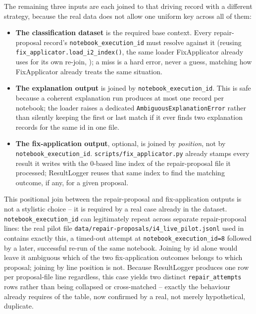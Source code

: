 The remaining three inputs are each joined to that driving record with a
different strategy, because the real data does not allow one uniform key
across all of them:

\begin{itemize}
  \item \textbf{The classification dataset} is the required base context.
        Every repair-proposal record's \texttt{notebook\_execution\_id}
        must resolve against it (reusing
        \texttt{fix\_applicator.load\_i2\_index()}, the same loader
        FixApplicator already uses for its own re-join,
        ); a miss is a hard error, never a guess,
        matching how FixApplicator already treats the same situation.
  \item \textbf{The explanation output} is joined by
        \texttt{notebook\_execution\_id}. This is safe because a coherent
        explanation run produces at most one record per notebook; the
        loader raises a dedicated \texttt{AmbiguousExplanationError} rather
        than silently keeping the first or last match if it ever finds two
        explanation records for the same id in one file.
  \item \textbf{The fix-application output}, optional, is joined by
        \emph{position}, not by \texttt{notebook\_\allowbreak execution\_id}.
        \texttt{scripts/fix\_applicator.py} already stamps every result it
        writes with the 0-based line index of the repair-proposal file it
        processed; ResultLogger reuses that same index to find the matching
        outcome, if any, for a given proposal.
\end{itemize}

This positional join between the repair-proposal and fix-application
outputs is not a stylistic choice -- it is required by a real case already
in the dataset. \texttt{notebook\_execution\_id} can legitimately repeat
across separate repair-proposal lines: the real pilot file
\texttt{data/repair-proposals/i4\_live\_pilot.jsonl} used in
 contains exactly this, a timed-out attempt at
\texttt{notebook\_execution\_id=8} followed by a later, successful re-run of
the same notebook. Joining by id alone would leave it ambiguous which of the
two fix-application outcomes belongs to which proposal; joining by line
position is not. Because ResultLogger produces one row per proposal-file
line regardless, this case yields two distinct \texttt{repair\_attempts}
rows rather than being collapsed or cross-matched -- exactly the behaviour
 already requires of the table, now confirmed by
a real, not merely hypothetical, duplicate.

